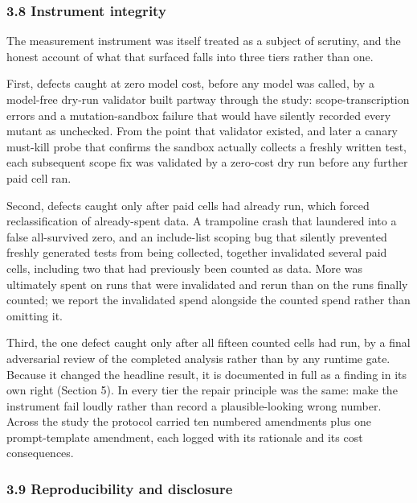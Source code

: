 \documentclass[
  11pt,
]{article}
\begin{document}
\subsubsection{3.8 Instrument integrity}\label{instrument-integrity}

The measurement instrument was itself treated as a subject of scrutiny,
and the honest account of what that surfaced falls into three tiers
rather than one.

First, defects caught at zero model cost, before any model was called,
by a model-free dry-run validator built partway through the study:
scope-transcription errors and a mutation-sandbox failure that would
have silently recorded every mutant as unchecked. From the point that
validator existed, and later a canary must-kill probe that confirms the
sandbox actually collects a freshly written test, each subsequent scope
fix was validated by a zero-cost dry run before any further paid cell
ran.

Second, defects caught only after paid cells had already run, which
forced reclassification of already-spent data. A trampoline crash that
laundered into a false all-survived zero, and an include-list scoping
bug that silently prevented freshly generated tests from being
collected, together invalidated several paid cells, including two that
had previously been counted as data. More was ultimately spent on runs
that were invalidated and rerun than on the runs finally counted; we
report the invalidated spend alongside the counted spend rather than
omitting it.

Third, the one defect caught only after all fifteen counted cells had
run, by a final adversarial review of the completed analysis rather than
by any runtime gate. Because it changed the headline result, it is
documented in full as a finding in its own right (Section 5). In every
tier the repair principle was the same: make the instrument fail loudly
rather than record a plausible-looking wrong number. Across the study
the protocol carried ten numbered amendments plus one prompt-template
amendment, each logged with its rationale and its cost consequences.

\subsubsection{3.9 Reproducibility and
disclosure}\label{reproducibility-and-disclosure}
\end{document}
